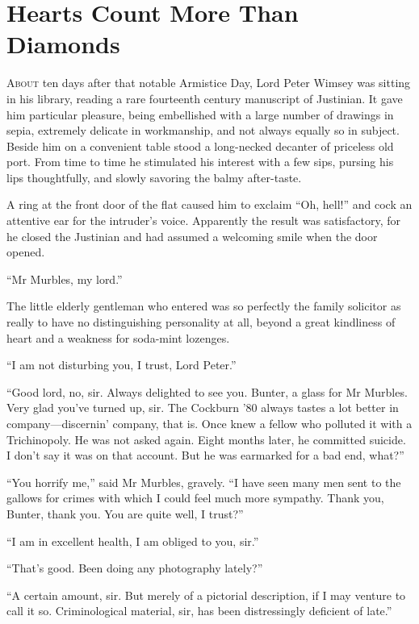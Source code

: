 \chapter{Hearts Count More Than Diamonds}
\lettrine[lines=4]{A}{bout} ten days after that notable Armistice Day, Lord Peter Wimsey was sitting in his library, reading a rare fourteenth century manuscript of Justinian. It gave him particular pleasure, being embellished with a large number of drawings in sepia, extremely delicate in workmanship, and not always equally so in subject. Beside him on a convenient table stood a long-necked decanter of priceless old port. From time to time he stimulated his interest with a few sips, pursing his lips thoughtfully, and slowly savoring the balmy after-taste.

A ring at the front door of the flat caused him to exclaim \enquote{Oh, hell!} and cock an attentive ear for the intruder's voice. Apparently the result was satisfactory, for he closed the Justinian and had assumed a welcoming smile when the door opened.

\enquote{Mr Murbles, my lord.}

The little elderly gentleman who entered was so perfectly the family solicitor as really to have no distinguishing personality at all, beyond a great kindliness of heart and a weakness for soda-mint lozenges.

\enquote{I am not disturbing you, I trust, Lord Peter.}

\enquote{Good lord, no, sir. Always delighted to see you. Bunter, a glass for Mr Murbles. Very glad you've turned up, sir. The Cockburn '80 always tastes a lot better in company\allowbreak---\allowbreak discernin' company, that is. Once knew a fellow who polluted it with a Trichinopoly. He was not asked again. Eight months later, he committed suicide. I don't say it was on that account. But he was earmarked for a bad end, what?}

\enquote{You horrify me,} said Mr Murbles, gravely. \enquote{I have seen many men sent to the gallows for crimes with which I could feel much more sympathy. Thank you, Bunter, thank you. You are quite well, I trust?}

\enquote{I am in excellent health, I am obliged to you, sir.}

\enquote{That's good. Been doing any photography lately?}

\enquote{A certain amount, sir. But merely of a pictorial description, if I may venture to call it so. Criminological material, sir, has been distressingly deficient of late.}

